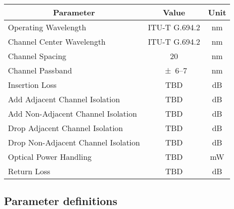 \begin{table}[!ht]
	\centering
	\begin{tabular}{|l|c|c|}
		\hline
		\multicolumn{1}{|c|}{\textbf{Parameter}} & \textbf{Value} & \textbf{Unit} \\ \hline
		Operating Wavelength & ITU-T G.694.2\cite{noauthor_g6942_2003} & \unit{\nm} \\ \hline
		Channel Center Wavelength & ITU-T G.694.2\cite{noauthor_g6942_2003} & \unit{\nm} \\ \hline
		Channel Spacing & 20\cite{noauthor_g6942_2003} & \unit{\nm} \\ \hline
		Channel Passband & \numrange[range-phrase=-]{\pm 6}{7}\cite{noauthor_g6942_2003} & \unit{\nm} \\ \hline
		Insertion Loss & TBD & \unit{\dB} \\ \hline
		Add Adjacent Channel Isolation & TBD & \unit{\dB} \\ \hline
		Add Non-Adjacent Channel Isolation & TBD & \unit{\dB} \\ \hline
		Drop Adjacent Channel Isolation & TBD & \unit{\dB} \\ \hline
		Drop Non-Adjacent Channel Isolation & TBD & \unit{\dB} \\ \hline
		Optical Power Handling & TBD & \unit{\mW} \\ \hline
		Return Loss & TBD & \unit{\dB} \\ \hline
	\end{tabular}
\end{table}

\subsection{Parameter definitions}

